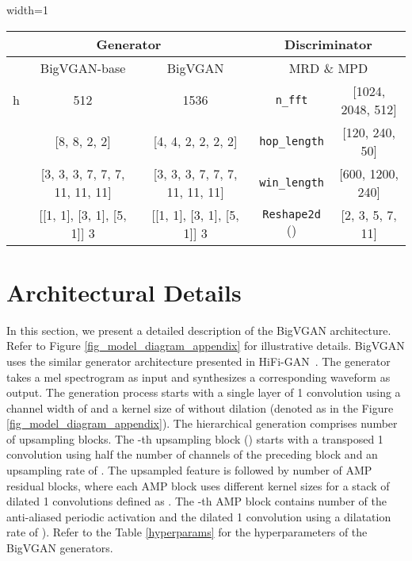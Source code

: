 \documentclass{article} \usepackage{iclr2023_conference,times}
\theoremstyle{plain}
\theoremstyle{definition}
\theoremstyle{remark}
\begin{document}
\begin{table*}[h]
\caption{\footnotesize
Hyperparameters of BigVGAN generators and discriminators.}
\label{hyperparams}
\vspace{-.3cm}
\begin{center}
\begin{small}
\begin{adjustbox}{width=1\textwidth}
\begin{tabular}{c|cc|c|c}
\toprule
\multicolumn{3}{c}{Generator} & \multicolumn{2}{c}{Discriminator}\\
\midrule
  & BigVGAN-base & BigVGAN & \multicolumn{2}{c}{MRD \& MPD} \\
\midrule
h  & 512  & 1536 & \texttt{n\_fft} & [1024, 2048, 512] \\
 & [8, 8, 2, 2]  & [4, 4, 2, 2, 2, 2] & \texttt{hop\_length} & [120, 240, 50] \\
  & [3, 3, 3, 7, 7, 7, 11, 11, 11] & [3, 3, 3, 7, 7, 7, 11, 11, 11] & \texttt{win\_length} & [600, 1200, 240]  \\
 & [[1, 1], [3, 1], [5, 1]]  3 & [[1, 1], [3, 1], [5, 1]]  3 & \texttt{Reshape2d} () & [2, 3, 5, 7, 11] \\
\bottomrule
\end{tabular}
\end{adjustbox}
\end{small}
\end{center}
\vskip -0.1in
\end{table*}


\section{Architectural Details}
\label{appendix:arch_detail}
In this section, we present a detailed description of the BigVGAN architecture. Refer to Figure \ref{fig_model_diagram_appendix} for illustrative details. BigVGAN uses the similar generator architecture presented in HiFi-GAN~\citep{kong2020hifi}. The generator takes a mel spectrogram as input and synthesizes a corresponding waveform as output. The generation process starts with a single layer of 1 convolution using a channel width of  and a kernel size of  without dilation (denoted as  in the Figure \ref{fig_model_diagram_appendix}). The hierarchical generation comprises  number of upsampling blocks. The -th upsampling block () starts with a transposed 1 convolution using half the number of channels of the preceding block and an upsampling rate of . The upsampled feature is followed by  number of AMP residual blocks, where each AMP block uses different kernel sizes for a stack of dilated 1 convolutions defined as . The -th AMP block contains  number of the anti-aliased periodic activation and the dilated 1 convolution using a dilatation rate of ). Refer to the Table \ref{hyperparams} for the hyperparameters of the BigVGAN generators.
\end{document}
